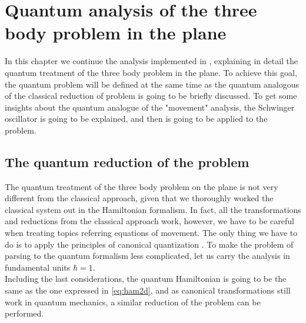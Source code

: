 \chapter{Quantum analysis of the three body problem in the plane}
In this chapter we continue the analysis implemented in \cite{alonso}, explaining in detail the quantum treatment of the three body problem in the plane. To achieve this goal, the quantum problem will be defined at the same time as the quantum analogous of the classical reduction of problem is going to be briefly discussed. To get some insights about the quantum analogue of the "movement" analysis, the Schwinger oscillator is going to be explained, and then is going to be applied to the problem.\\

\section{The quantum reduction of the problem}
The quantum treatment of the three body problem on the plane is not very different from the classical approach, given that we thoroughly worked the classical system out in the Hamiltonian formalism. In fact, all the transformations and reductions from the classical approach work, however, we have to be careful when treating topics referring equations of movement.  The only thing we have to do is to apply the principles of canonical quantization \cite{Canonical quantization}. To make the problem of parsing to the quantum formalism less complicated, let us carry the analysis in fundamental units $\hbar =1$. \\

Including the last considerations, the quantum Hamiltonian is going to be the same as the one expressed in \eqref{eq:ham2d}, and as canonical transformations still work in quantum mechanics, a similar reduction of the problem can be performed.\\


